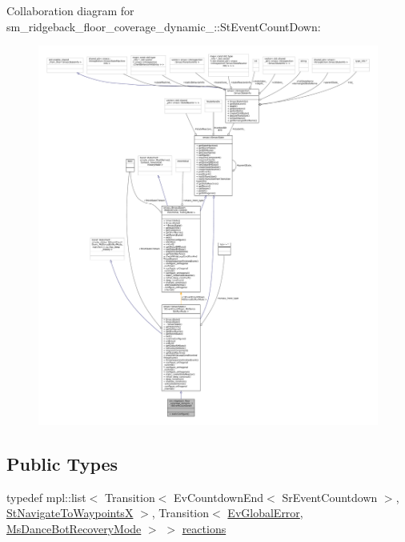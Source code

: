 Collaboration diagram for sm\+\_\+ridgeback\+\_\+floor\+\_\+coverage\+\_\+dynamic\+\_\+:\+:St\+Event\+Count\+Down\+:
\nopagebreak
\begin{figure}[H]
\begin{center}
\leavevmode
\includegraphics[width=350pt]{structsm__ridgeback__floor__coverage__dynamic__1_1_1StEventCountDown__coll__graph}
\end{center}
\end{figure}
\subsection*{Public Types}
\begin{DoxyCompactItemize}
\item 
typedef mpl\+::list$<$ Transition$<$ Ev\+Countdown\+End$<$ Sr\+Event\+Countdown $>$, \hyperlink{structsm__ridgeback__floor__coverage__dynamic__1_1_1StNavigateToWaypointsX}{St\+Navigate\+To\+WaypointsX} $>$, Transition$<$ \hyperlink{structsm__ridgeback__floor__coverage__dynamic__1_1_1EvGlobalError}{Ev\+Global\+Error}, \hyperlink{classsm__ridgeback__floor__coverage__dynamic__1_1_1MsDanceBotRecoveryMode}{Ms\+Dance\+Bot\+Recovery\+Mode} $>$ $>$ \hyperlink{structsm__ridgeback__floor__coverage__dynamic__1_1_1StEventCountDown_afe82e1a76bd4a327fbbfcbff20224557}{reactions}
\end{DoxyCompactItemize}
